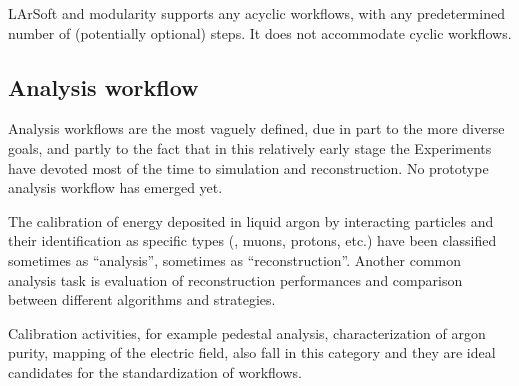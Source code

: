 LArSoft and \ART modularity supports any acyclic workflows,
with any predetermined number of (potentially optional) steps.
It does not accommodate cyclic workflows.


\subsection{Analysis workflow}
\label{ssec:Workflows:Analysis}

Analysis workflows are the most vaguely defined,
due in part to the more diverse goals,
and partly to the fact that in this relatively early stage the Experiments
have devoted most of the time to simulation and reconstruction.
No prototype analysis workflow has emerged yet.

The calibration of energy deposited in liquid argon by interacting particles
and their identification as specific types (\eg, muons, protons, etc.)
have been classified sometimes as ``analysis'', sometimes as ``reconstruction''.
Another common analysis task is evaluation of reconstruction performances
and comparison between different algorithms and strategies.

Calibration activities, for example pedestal analysis,
characterization of argon purity, mapping of the electric field,
also fall in this category and they are ideal candidates for the standardization of workflows.
